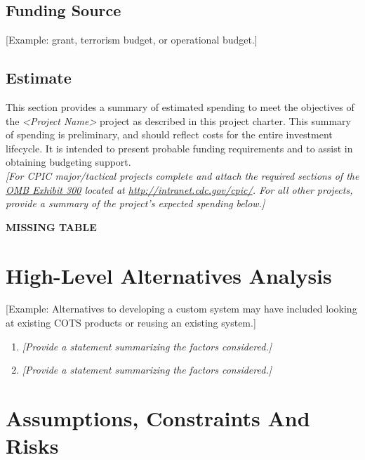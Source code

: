 \documentclass[a4paper, 11pt]{article}
\begin{document}
\hypertarget{funding-source}{%
\subsection{Funding Source}\label{funding-source}}

{[}Example: grant, terrorism budget, or operational budget.{]}

\hypertarget{estimate}{%
\subsection{Estimate}\label{estimate}}

This section provides a summary of estimated spending to meet the
objectives of the \emph{\textless{}Project Name\textgreater{}} project
as described in this project charter. This summary of spending is
preliminary, and should reflect costs for the entire investment
lifecycle. It is intended to present probable funding requirements and
to assist in obtaining budgeting support.\\
\emph{{[}For CPIC major/tactical projects complete and attach the
required sections of the \href{http://intranet.cdc.gov/cpic/}{OMB
Exhibit 300} located at \url{http://intranet.cdc.gov/cpic/}. For all
other projects, provide a summary of the project's expected spending}
\emph{below.{]}}

\textbf{MISSING TABLE} %

\hypertarget{high-level-alternatives-analysis}{%
\section{High-Level Alternatives Analysis}\label{high-level-alternatives-analysis}}

{[}Example: Alternatives to developing a custom system may have included
looking at existing COTS products or reusing an existing system.{]}

\begin{enumerate}
\def\labelenumi{\arabic{enumi}.}
\item
  \emph{{[}Provide a statement summarizing the factors considered.{]}}
\item
  \emph{{[}Provide a statement summarizing the factors considered.{]}}
\end{enumerate}

\hypertarget{assumptions-constraints-and-risks}{%
\section{Assumptions, Constraints And Risks}\label{assumptions-constraints-and-risks}}
\end{document}
